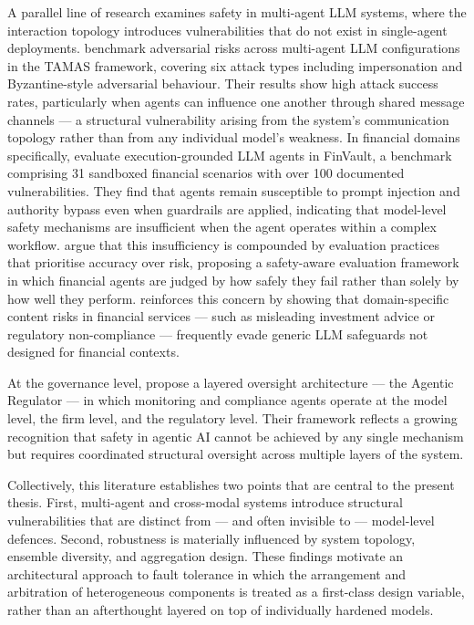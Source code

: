 A parallel line of research examines safety in multi-agent LLM systems, where the interaction topology introduces vulnerabilities that do not exist in single-agent deployments. \cite{kavathekar2025tamas} benchmark adversarial risks across multi-agent LLM configurations in the TAMAS framework, covering six attack types including impersonation and Byzantine-style adversarial behaviour. Their results show high attack success rates, particularly when agents can influence one another through shared message channels --- a structural vulnerability arising from the system's communication topology rather than from any individual model's weakness. In financial domains specifically, \cite{yang_finvault_2026} evaluate execution-grounded LLM agents in FinVault, a benchmark comprising 31 sandboxed financial scenarios with over 100 documented vulnerabilities. They find that agents remain susceptible to prompt injection and authority bypass even when guardrails are applied, indicating that model-level safety mechanisms are insufficient when the agent operates within a complex workflow. \cite{chen_standard_2025} argue that this insufficiency is compounded by evaluation practices that prioritise accuracy over risk, proposing a safety-aware evaluation framework in which financial agents are judged by how safely they fail rather than solely by how well they perform. \cite{gehrmann2025risks} reinforces this concern by showing that domain-specific content risks in financial services --- such as misleading investment advice or regulatory non-compliance --- frequently evade generic LLM safeguards not designed for financial contexts.

At the governance level, \cite{kurshan_agentic_2025} propose a layered oversight architecture --- the Agentic Regulator --- in which monitoring and compliance agents operate at the model level, the firm level, and the regulatory level. Their framework reflects a growing recognition that safety in agentic AI cannot be achieved by any single mechanism but requires coordinated structural oversight across multiple layers of the system.

Collectively, this literature establishes two points that are central to the present thesis. First, multi-agent and cross-modal systems introduce structural vulnerabilities that are distinct from --- and often invisible to --- model-level defences. Second, robustness is materially influenced by system topology, ensemble diversity, and aggregation design. These findings motivate an architectural approach to fault tolerance in which the arrangement and arbitration of heterogeneous components is treated as a first-class design variable, rather than an afterthought layered on top of individually hardened models.

